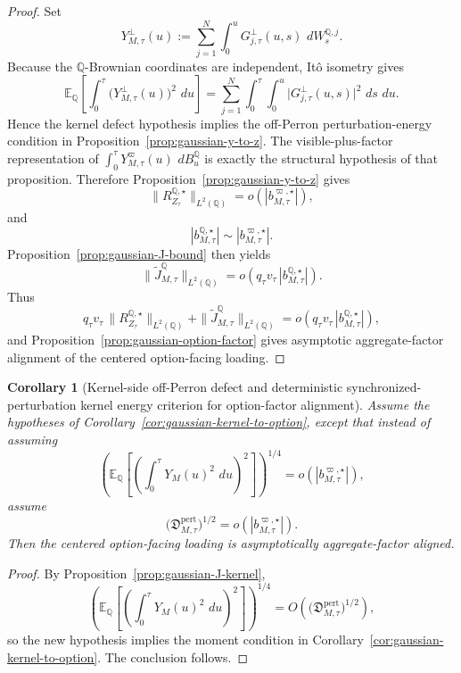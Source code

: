 \documentclass[11pt,a4paper]{amsart}
\theoremstyle{plain}
\newtheorem{corollary}[theorem]{Corollary}
\theoremstyle{definition}
\theoremstyle{remark}
\newcommand{\QQ}{\mathbb{Q}}
\newcommand{\EE}{\mathbb{E}}
\newcommand{\dd}{\,d}
\begin{document}
\begin{proof}
Set
\[
        Y_{M,\tau}^{\perp}(u)
        :=
        \sum_{j=1}^N \int_0^u G_{j,\tau}^{\perp}(u,s)\,\dd W_s^{\QQ,j}.
\]
Because the \(\QQ\)-Brownian coordinates are independent, It\^o isometry gives
\[
        \EE_\QQ\!\left[
                \int_0^\tau \bigl(Y_{M,\tau}^{\perp}(u)\bigr)^2\,\dd u
        \right]
        =
        \sum_{j=1}^N \int_0^\tau \int_0^u
        \bigl|G_{j,\tau}^{\perp}(u,s)\bigr|^2\,\dd s\,\dd u.
\]
Hence the kernel defect hypothesis implies the off-Perron perturbation-energy condition in
Proposition~\ref{prop:gaussian-y-to-z}.  The visible-plus-factor representation of
\(\int_0^\tau Y_{M,\tau}^{\varpi}(u)\,\dd B_u^\QQ\) is exactly the structural hypothesis of that
proposition.  Therefore Proposition~\ref{prop:gaussian-y-to-z} gives
\[
        \|R_{Z_\tau}^{\QQ,\star}\|_{L^2(\QQ)}
        =
        o\!\left(|b_{M,\tau}^{\varpi,\star}|\right),
\]
and
\[
        |b_{M,\tau}^{\QQ,\star}|
        \sim
        |b_{M,\tau}^{\varpi,\star}|.
\]
Proposition~\ref{prop:gaussian-J-bound} then yields
\[
        \|\widetilde J_{M,\tau}^\QQ\|_{L^2(\QQ)}
        =
        o\!\left(q_\tau v_\tau\,|b_{M,\tau}^{\QQ,\star}|\right).
\]
Thus
\[
        q_\tau v_\tau\,\|R_{Z_\tau}^{\QQ,\star}\|_{L^2(\QQ)}
        +
        \|\widetilde J_{M,\tau}^\QQ\|_{L^2(\QQ)}
        =
        o\!\left(q_\tau v_\tau\,|b_{M,\tau}^{\QQ,\star}|\right),
\]
and Proposition~\ref{prop:gaussian-option-factor} gives asymptotic aggregate-factor alignment of
the centered option-facing loading.
\end{proof}

\begin{corollary}[Kernel-side off-Perron defect and deterministic synchronized-perturbation kernel energy criterion for option-factor alignment]\label{cor:gaussian-kernel-to-option-kernel}
Assume the hypotheses of Corollary~\ref{cor:gaussian-kernel-to-option}, except that instead of
assuming
\[
        \left(
                \EE_\QQ\!\left[
                        \left(
                                \int_0^\tau Y_M(u)^2\,\dd u
                        \right)^2
                \right]
        \right)^{1/4}
        =
        o\!\left(|b_{M,\tau}^{\varpi,\star}|\right),
\]
assume
\[
        \bigl(\mathfrak D_{M,\tau}^{\mathrm{pert}}\bigr)^{1/2}
        =
        o\!\left(|b_{M,\tau}^{\varpi,\star}|\right).
\]
Then the centered option-facing loading is asymptotically aggregate-factor aligned.
\end{corollary}

\begin{proof}
By Proposition~\ref{prop:gaussian-J-kernel},
\[
        \left(
                \EE_\QQ\!\left[
                        \left(
                                \int_0^\tau Y_M(u)^2\,\dd u
                        \right)^2
                \right]
        \right)^{1/4}
        =
        O\!\left(
                \bigl(\mathfrak D_{M,\tau}^{\mathrm{pert}}\bigr)^{1/2}
        \right),
\]
so the new hypothesis implies the moment condition in
Corollary~\ref{cor:gaussian-kernel-to-option}.  The conclusion follows.
\end{proof}
\end{document}
